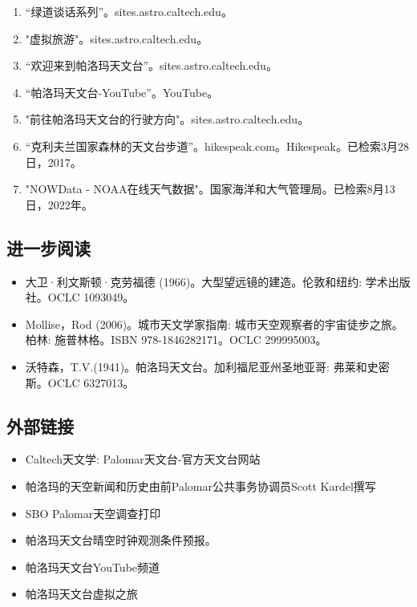 \begin{enumerate}
\item “绿道谈话系列”。sites.astro.caltech.edu。
\item "虚拟旅游"。sites.astro.caltech.edu。
\item “欢迎来到帕洛玛天文台”。sites.astro.caltech.edu。
\item “帕洛玛天文台-YouTube”。YouTube。
\item "前往帕洛玛天文台的行驶方向"。sites.astro.caltech.edu。
\item “克利夫兰国家森林的天文台步道”。hikespeak.com。Hikespeak。已检索3月28日，2017。
\item "NOWData - NOAA在线天气数据"。国家海洋和大气管理局。已检索8月13日，2022年。
\end{enumerate}
\subsection{进一步阅读}
\begin{itemize}
\item 大卫·利文斯顿·克劳福德 (1966)。大型望远镜的建造。伦敦和纽约: 学术出版社。OCLC 1093049。
\item Mollise，Rod (2006)。城市天文学家指南: 城市天空观察者的宇宙徒步之旅。柏林: 施普林格。ISBN 978-1846282171。OCLC 299995003。
\item 沃特森，T.V.(1941)。帕洛玛天文台。加利福尼亚州圣地亚哥: 弗莱和史密斯。OCLC 6327013。
\end{itemize}
\subsection{外部链接}
\begin{itemize}
\item Caltech天文学: Palomar天文台-官方天文台网站
\item 帕洛玛的天空新闻和历史由前Palomar公共事务协调员Scott Kardel撰写
\item SBO Palomar天空调查打印
\item 帕洛玛天文台晴空时钟观测条件预报。
\item 帕洛玛天文台YouTube频道
\item 帕洛玛天文台虚拟之旅
\end{itemize}